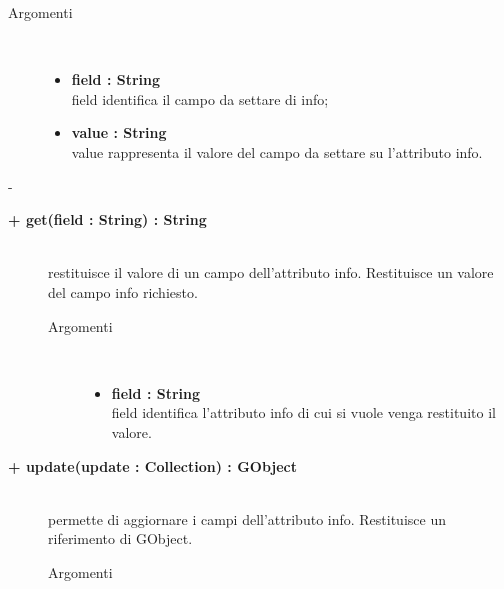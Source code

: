 \begin{description}
\begin{description}
		\begin{description}
			\item[Argomenti] \hfill \\
				\begin{itemize}
				
					\item \textbf{field : String			} \hfill \\
					field identifica il campo da settare di info;
					\item \textbf{value : String			} \hfill \\
					value rappresenta il valore del campo da settare su l'attributo info.
				\end{itemize}
		\end{description}-

\end{description}

\begin{description}
		\item[\textbf{+ get(field : String) : String			}] \hfill \\
			restituisce il valore di un campo dell'attributo info. Restituisce un valore del campo info richiesto.
			
		\begin{description}
			\item[Argomenti] \hfill \\
				\begin{itemize}
				
					\item \textbf{field : String			} \hfill \\
					field identifica l'attributo info di cui si vuole venga restituito il valore.
				\end{itemize}
		\end{description}

\end{description}

\begin{description}
		\item[\textbf{\color{blue}+ update(update : Collection) : GObject			}] \hfill \\
			permette di aggiornare i campi dell'attributo info. Restituisce un riferimento di GObject.
			
		\begin{description}
			\item[Argomenti] \hfill \\
				\begin{itemize}
				

\end{itemize}
\end{description}
\end{description}
\end{description}
